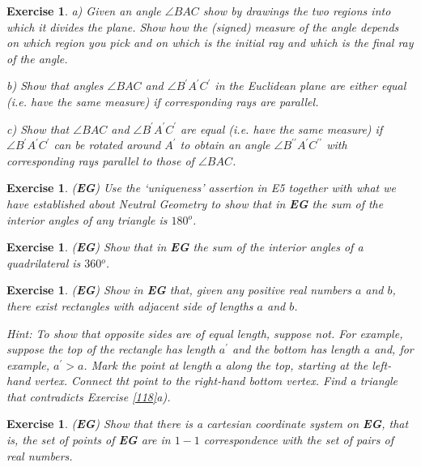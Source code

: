 \documentclass{article}%
\providecommand{\U}[1]{\protect\rule{.1in}{.1in}}
\newtheorem{exercise}[theorem]{Exercise}
\begin{document}
\begin{exercise}
a) Given an angle $\angle BAC$ show by drawings the two regions into which it
divides the plane. Show how the (signed) measure of the angle depends on which
region you pick and on which is the initial ray and which is the final ray of
the angle.

b) Show that angles $\angle BAC$ and $\angle B^{\prime}A^{\prime}C^{\prime}$
in the Euclidean plane are either equal (i.e. have the same measure) if
corresponding rays are parallel.

c) Show that $\angle BAC$ and $\angle B^{\prime}A^{\prime}C^{\prime}$ are
equal (i.e. have the same measure) if $\angle B^{\prime}A^{\prime}C^{\prime}$
can be rotated around $A^{\prime}$ to obtain an angle $\angle B^{\prime\prime
}A^{\prime}C^{\prime\prime}$ with corresponding rays parallel to those of
$\angle BAC$.
\end{exercise}

\begin{exercise}
(\textbf{EG}) Use the `uniqueness' assertion in E5 together with what we have
established about Neutral Geometry to show that in \textbf{EG} the sum of the
interior angles of any triangle is $180%
{{}^o}%
$.
\end{exercise}

\begin{exercise}
(\textbf{EG}) Show that in \textbf{EG} the sum of the interior angles of a
quadrilateral is $360%
{{}^o}%
$.
\end{exercise}

\begin{exercise}
\label{112}(\textbf{EG}) Show in \textbf{EG} that, given any positive real
numbers $a$ and $b$, there exist rectangles with adjacent side of lengths $a$
and $b$.

Hint: To show that opposite sides are of equal length, suppose not. For
example, suppose the top of the rectangle has length $a^{\prime}$ and the
bottom has length $a$ and, for example, $a^{\prime}>a$. Mark the point at
length $a$ along the top, starting at the left-hand vertex. Connect tht point
to the right-hand bottom vertex. Find a triangle that contradicts Exercise
\ref{118}a).
\end{exercise}

\begin{exercise}
(\textbf{EG}) Show that there is a cartesian coordinate system on \textbf{EG},
that is, the set of points of \textbf{EG} are in $1-1$ correspondence with the
set of pairs of real numbers.
\end{exercise}
\end{document}
